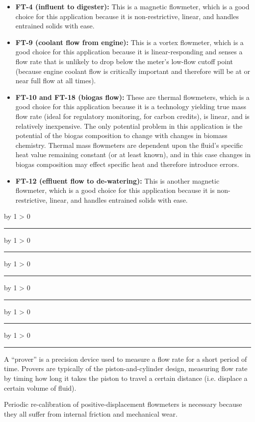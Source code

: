 \documentclass[12pt,a4paper]{article}
\def\svar{
           \advance\answnum by 1
           \ifnum \answnum > 0
                \hrule
                \vskip 3pt
                \leftline{Svar \the\answnum}
                \vskip 3pt \fi}
\begin{document}
\begin{itemize}
\item{} {\bf FT-4 (influent to digester):} This is a magnetic flowmeter, which is a good choice for this application because it is non-restrictive, linear, and handles entrained solids with ease.
\vskip 20pt
\item{} {\bf FT-9 (coolant flow from engine):} This is a vortex flowmeter, which is a good choice for this application because it is linear-responding and senses a flow rate that is unlikely to drop below the meter's low-flow cutoff point (because engine coolant flow is critically important and therefore will be at or near full flow at all times).
\vskip 20pt
\item{} {\bf FT-10 and FT-18 (biogas flow):} These are thermal flowmeters, which is a good choice for this application because it is a technology yielding true mass flow rate (ideal for regulatory monitoring, for carbon credits), is linear, and is relatively inexpensive.  The only potential problem in this application is the potential of the biogas composition to change with changes in biomass chemistry.  Thermal mass flowmeters are dependent upon the fluid's specific heat value remaining constant (or at least known), and in this case changes in biogas composition may effect specific heat and therefore introduce errors.
\vskip 20pt
\item{} {\bf FT-12 (effluent flow to de-watering):} This is another magnetic flowmeter, which is a good choice for this application because it is non-restrictive, linear, and handles entrained solids with ease.
\end{itemize}

\vskip 10pt \filbreak 
\svar{} 


\vskip 10pt \filbreak 
\svar{} 


\vskip 10pt \filbreak 
\svar{} 


\vskip 10pt \filbreak 
\svar{} 


\vskip 10pt \filbreak 
\svar{} 


\vskip 10pt \filbreak 
\svar{} 

A ``prover'' is a precision device used to measure a flow rate for a short period of time.  Provers are typically of the piston-and-cylinder design, measuring flow rate by timing how long it takes the piston to travel a certain distance (i.e. displace a certain volume of fluid).

Periodic re-calibration of positive-displacement flowmeters is necessary because they all suffer from internal friction and mechanical wear.
\end{document}
